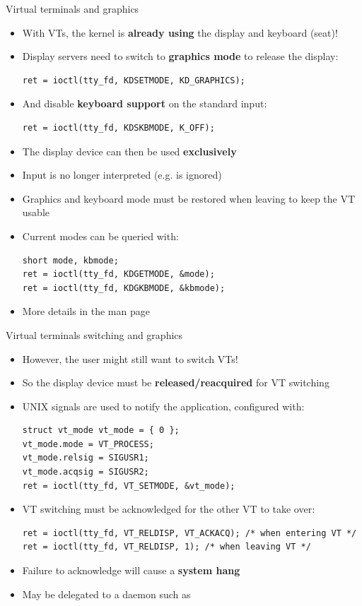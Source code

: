 \begin{frame}[fragile]{Virtual terminals and graphics}
  \begin{itemize}
  \item With VTs, the kernel is \textbf{already using} the display and keyboard (seat)!
  \item Display servers need to switch to \textbf{graphics mode} to release the display:
  \begin{verbatim}
ret = ioctl(tty_fd, KDSETMODE, KD_GRAPHICS);
  \end{verbatim}
  \item And disable \textbf{keyboard support} on the standard input:
  \begin{verbatim}
ret = ioctl(tty_fd, KDSKBMODE, K_OFF);
  \end{verbatim}
  \item The display device can then be used \textbf{exclusively}
  \item Input is no longer interpreted (e.g.  is ignored)
  \item Graphics and keyboard mode must be restored when leaving to keep the VT usable
  \item Current modes can be queried with:
  \begin{verbatim}
short mode, kbmode;
ret = ioctl(tty_fd, KDGETMODE, &mode);
ret = ioctl(tty_fd, KDGKBMODE, &kbmode);
  \end{verbatim}
  \item More details in the  man page
  \end{itemize}
\end{frame}

\begin{frame}[fragile]{Virtual terminals switching and graphics}
  \begin{itemize}
  \item However, the user might still want to switch VTs!
  \item So the display device must be \textbf{released/reacquired} for VT switching
  \item UNIX signals are used to notify the application, configured with:
  \begin{verbatim}
struct vt_mode vt_mode = { 0 };
vt_mode.mode = VT_PROCESS;
vt_mode.relsig = SIGUSR1;
vt_mode.acqsig = SIGUSR2;
ret = ioctl(tty_fd, VT_SETMODE, &vt_mode);
  \end{verbatim}
  \item VT switching must be acknowledged for the other VT to take over:
  \begin{verbatim}
ret = ioctl(tty_fd, VT_RELDISP, VT_ACKACQ); /* when entering VT */
ret = ioctl(tty_fd, VT_RELDISP, 1); /* when leaving VT */
  \end{verbatim}
  \item Failure to acknowledge will cause a \textbf{system hang}
  \item May be delegated to a daemon such as 
  \end{itemize}
\end{frame}
